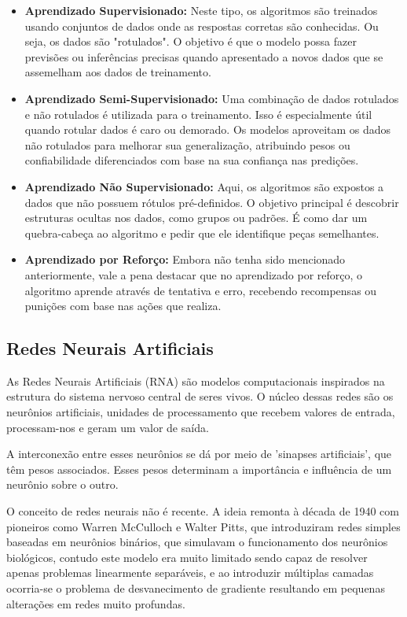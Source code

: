 \documentclass[conference]{IEEEtran}
\begin{document}
\begin{itemize}
    \item {\textbf{Aprendizado Supervisionado:}}
    Neste tipo, os algoritmos são treinados usando conjuntos de dados onde as respostas corretas são 
    conhecidas. Ou seja, os dados são "rotulados". O objetivo é que o modelo possa fazer previsões ou 
    inferências precisas quando apresentado a novos dados que se assemelham aos dados de treinamento.

    \item {\textbf{Aprendizado Semi-Supervisionado:}}
    Uma combinação de dados rotulados e não rotulados é utilizada para o treinamento. Isso é 
    especialmente útil quando rotular dados é caro ou demorado. Os modelos aproveitam os dados não 
    rotulados para melhorar sua generalização, atribuindo pesos ou confiabilidade diferenciados com 
    base na sua confiança nas predições.

    \item {\textbf{Aprendizado Não Supervisionado:}}
    Aqui, os algoritmos são expostos a dados que não possuem rótulos pré-definidos. O objetivo 
    principal é descobrir estruturas ocultas nos dados, como grupos ou padrões. É como dar um 
    quebra-cabeça ao algoritmo e pedir que ele identifique peças semelhantes.

    \item {\textbf{Aprendizado por Reforço:}}
    Embora não tenha sido mencionado anteriormente, vale a pena destacar que no aprendizado por reforço, 
    o algoritmo aprende através de tentativa e erro, recebendo recompensas ou punições com base nas 
    ações que realiza.
\end{itemize}

\subsection{Redes Neurais Artificiais}
As Redes Neurais Artificiais (RNA) são modelos computacionais inspirados na estrutura do sistema 
nervoso central de seres vivos. O núcleo dessas redes são os neurônios artificiais, unidades de 
processamento que recebem valores de entrada, processam-nos e geram um valor de saída.

A interconexão entre esses neurônios se dá por meio de 'sinapses artificiais', que têm pesos 
associados. Esses pesos determinam a importância e influência de um neurônio sobre o outro.

O conceito de redes neurais não é recente. A ideia remonta à década de 1940 com pioneiros como 
Warren McCulloch e Walter Pitts, que introduziram redes simples baseadas em neurônios binários, 
que simulavam o funcionamento dos neurônios biológicos, contudo este modelo era muito limitado sendo 
capaz de resolver apenas problemas linearmente separáveis, e ao introduzir múltiplas camadas 
ocorria-se o problema de desvanecimento de gradiente resultando em pequenas alterações em redes 
muito profundas.\cite{braga2016redes}
\end{document}
